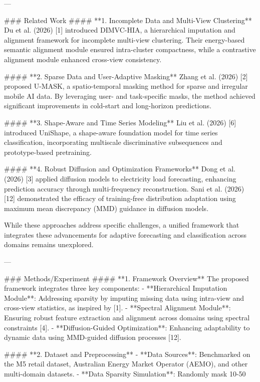 ---

### Related Work  
#### **1. Incomplete Data and Multi-View Clustering**  
Du et al. (2026) [1] introduced DIMVC-HIA, a hierarchical imputation and alignment framework for incomplete multi-view clustering. Their energy-based semantic alignment module ensured intra-cluster compactness, while a contrastive alignment module enhanced cross-view consistency.  

#### **2. Sparse Data and User-Adaptive Masking**  
Zhang et al. (2026) [2] proposed U-MASK, a spatio-temporal masking method for sparse and irregular mobile AI data. By leveraging user- and task-specific masks, the method achieved significant improvements in cold-start and long-horizon predictions.  

#### **3. Shape-Aware and Time Series Modeling**  
Liu et al. (2026) [6] introduced UniShape, a shape-aware foundation model for time series classification, incorporating multiscale discriminative subsequences and prototype-based pretraining.  

#### **4. Robust Diffusion and Optimization Frameworks**  
Dong et al. (2026) [3] applied diffusion models to electricity load forecasting, enhancing prediction accuracy through multi-frequency reconstruction. Sani et al. (2026) [12] demonstrated the efficacy of training-free distribution adaptation using maximum mean discrepancy (MMD) guidance in diffusion models.  

While these approaches address specific challenges, a unified framework that integrates these advancements for adaptive forecasting and classification across domains remains unexplored.

---

### Methods/Experiment  
#### **1. Framework Overview**  
The proposed framework integrates three key components:  
- **Hierarchical Imputation Module**: Addressing sparsity by imputing missing data using intra-view and cross-view statistics, as inspired by [1].  
- **Spectral Alignment Module**: Ensuring robust feature extraction and alignment across domains using spectral constraints [4].  
- **Diffusion-Guided Optimization**: Enhancing adaptability to dynamic data using MMD-guided diffusion processes [12].  

#### **2. Dataset and Preprocessing**  
- **Data Sources**: Benchmarked on the M5 retail dataset, Australian Energy Market Operator (AEMO), and other multi-domain datasets.  
- **Data Sparsity Simulation**: Randomly mask 10-50%

